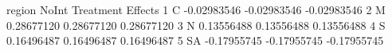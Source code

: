 \begin{Schunk}
\begin{Soutput}
  region       NoInt   Treatment     Effects
1      C -0.02983546 -0.02983546 -0.02983546
2      M  0.28677120  0.28677120  0.28677120
3      N  0.13556488  0.13556488  0.13556488
4      S  0.16496487  0.16496487  0.16496487
5     SA -0.17955745 -0.17955745 -0.17955745
\end{Soutput}
\end{Schunk}
